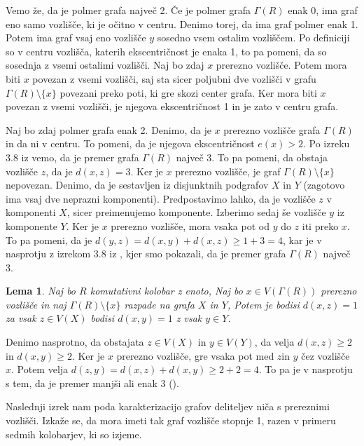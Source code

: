 \documentclass[a4paper, 12pt]{amsart}
\theoremstyle{definition} %
\theoremstyle{plain} %
\newtheorem{lema}[definicija]{Lema}
\begin{document}
\proof
Vemo že, da je polmer grafa največ 2.
Če je polmer grafa $\Gamma(R)$ enak 0, ima graf eno samo vozlišče, ki je očitno v centru. Denimo torej, da ima graf polmer enak 1. Potem ima graf vsaj eno vozlišče $y$ sosedno vsem ostalim vozliščem. Po definiciji so v centru vozlišča, katerih ekscentričnost je enaka 1, to pa pomeni, da so sosednja z vsemi ostalimi vozlišči. Naj bo zdaj $x$ prerezno vozlišče. Potem mora biti $x$ povezan z vsemi vozlišči, saj sta sicer poljubni dve vozlišči v grafu $\Gamma(R)\setminus \{x\}$ povezani preko poti, ki gre skozi center grafa. Ker mora biti $x$ povezan z vsemi vozlišči, je njegova ekscentričnost 1 in je zato v centru grafa.

Naj bo zdaj polmer grafa enak 2. Denimo, da je $x$ prerezno vozlišče grafa $\Gamma(R)$ in da ni v centru. To pomeni, da je njegova ekscentričnost $e(x) > 2$. Po izreku 3.8 iz \cite{diploma} vemo, da je premer grafa $\Gamma(R)$ največ 3. To pa pomeni, da obstaja vozlišče $z$, da je $d(x,z) = 3$. Ker je $x$ prerezno vozlišče, je graf $\Gamma(R) \setminus \{x\}$ nepovezan. Denimo, da je sestavljen iz disjunktnih podgrafov $X$ in $Y$ (zagotovo ima vsaj dve neprazni komponenti). Predpostavimo lahko, da je vozlišče $z$ v komponenti $X$, sicer preimenujemo komponente. Izberimo sedaj še vozlišče $y$ iz komponente $Y$. Ker je $x$ prerezno vozlišče, mora vsaka pot od $y$ do $z$ iti preko $x$. To pa pomeni, da je $d(y,z) = d(x,y) + d(x,z) \ge 1 + 3 = 4$, kar je v nasprotju z izrekom 3.8 iz \cite{diploma}, kjer smo pokazali, da je premer grafa $\Gamma(R)$ največ 3.  
\endproof

\begin{lema}
Naj bo $R$ komutativni kolobar z enoto, Naj bo $x\in V(\Gamma(R))$ prerezno vozlišče in naj $\Gamma(R) \setminus \{x\}$ razpade na grafa $X$ in $Y$, Potem je bodisi $d(x,z)= 1$ za vsak $z\in V(X)$ bodisi $d(x,y) = 1$ z vsak $y\in Y$.
\end{lema}

\proof
Denimo nasprotno, da obstajata $z\in V(X)$ in $y\in V(Y)$, da velja $d(x,z)\ge2$ in $d(x,y)\ge 2$. Ker je $x$ prerezno vozlišče, gre vsaka pot med $z$in $y$ čez vozlišče $x$. Potem velja $d(z,y)= d(x,z) + d(x,y) \ge 2 + 2 =4 $. To pa je v nasprotju s tem, da je premer manjši ali enak 3 (\cite{diploma}).
\endproof

Naslednji izrek nam poda karakterizacijo grafov deliteljev niča s prereznimi vozlišči. Izkaže se, da mora imeti tak graf vozlišče stopnje 1, razen v primeru sedmih kolobarjev, ki so izjeme.
\end{document}
